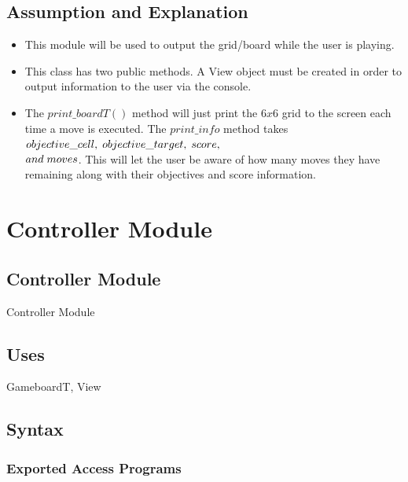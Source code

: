 \documentclass[12pt]{article}
\begin{document}
\subsection* {Assumption and Explanation}
\begin{itemize}
\item This module will be used to output the grid/board while the user is playing. 
\item This class has two public methods. A View object must be created in order to output information to the user via the console. 
\item The $print\_boardT()$ method will just print the $6x6$ grid to the screen each time a move is executed. The $print\_info$ method takes $objective\_cell, \thickspace objective\_target, \thickspace score, \thickspace$\\ $ and \thickspace moves$. This will let the user be aware of how many moves they have remaining along with their objectives and score information. 
\end{itemize}


\newpage

\section* {Controller Module}

\subsection*{Controller Module}

Controller Module

\subsection* {Uses}

\noindent GameboardT, View
\subsection* {Syntax}

\subsubsection* {Exported Access Programs}
\end{document}
